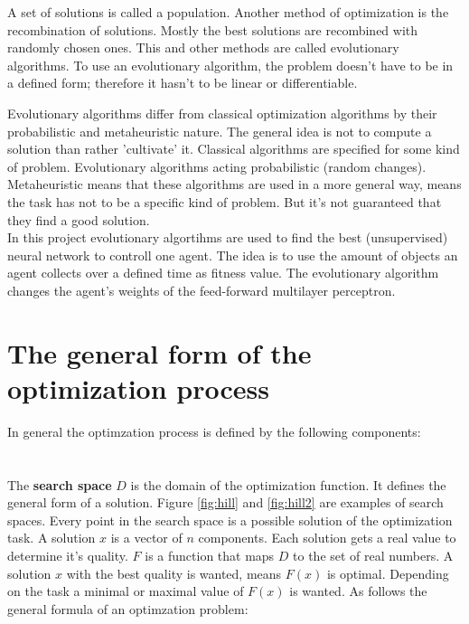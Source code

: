 \documentclass[10pt,a4paper,DIV=11]{scrreprt}
\begin{document}
A set of solutions is called a population. Another method of optimization is the recombination of solutions. Mostly the best solutions are recombined with randomly chosen
ones. This and other methods are called evolutionary algorithms. To use an evolutionary algorithm, the problem doesn't have to be in a defined form;
therefore it hasn't to be linear or differentiable.

Evolutionary algorithms differ from classical optimization algorithms by their probabilistic and metaheuristic nature. The general idea is not to compute a solution than rather 'cultivate' it. Classical algorithms are specified for some kind of problem. Evolutionary algorithms acting probabilistic (random changes). Metaheuristic means that these algorithms are used in a more general way, means the task has not to be a specific kind of problem. But it's not guaranteed that they find a good solution. \\


In this project evolutionary algortihms are used to find the best 
(unsupervised) neural network to controll one agent. The idea is to use the amount of objects an agent collects over a defined time as fitness value. The evolutionary algorithm changes the agent's weights of the feed-forward multilayer perceptron.

\section{The general form of the optimization process}
In general the optimzation process is defined by the following components: \\

   \\
\\

The \textbf{search space} $D$ is the domain of the optimization function. It defines the general form of a solution. Figure \ref{fig:hill} and \ref{fig:hill2} are examples of search spaces. Every point in the search space is a possible solution of the optimization task.
A solution $x$ is a vector of $n$ components. Each solution gets a real value to determine it's quality. $F$ is a function that maps $D$ to the set of real numbers. A solution $x$ with the best quality is wanted, means $F(x)$ is optimal. Depending on the task a minimal or maximal value of $F(x)$ is wanted. As follows the general formula of an optimzation problem:
\end{document}
